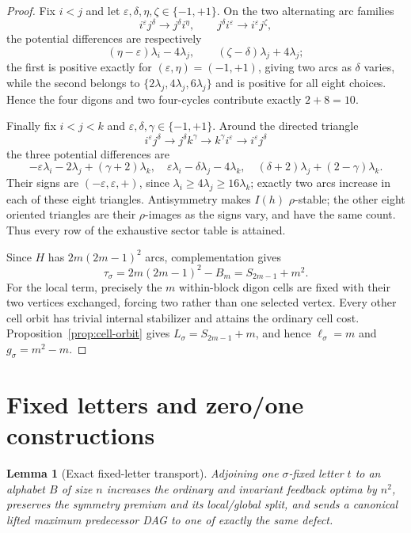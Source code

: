 \documentclass[11pt,a4paper]{article}
\newtheorem{lemma}[theorem]{Lemma}
\theoremstyle{remark}
\begin{document}
\begin{proof}
Fix \(i<j\) and let
\(\varepsilon,\delta,\eta,\zeta\in\{-1,+1\}\).  On the two alternating
arc families
\[
 i^\varepsilon j^\delta\to j^\delta i^\eta,
 \qquad
 j^\delta i^\varepsilon\to i^\varepsilon j^\zeta,
\]
the potential differences are respectively
\[
 (\eta-\varepsilon)\lambda_i-4\lambda_j,
 \qquad (\zeta-\delta)\lambda_j+4\lambda_j;
\]
the first is positive exactly for
\((\varepsilon,\eta)=(-1,+1)\), giving two arcs as \(\delta\) varies,
while the second belongs to \(\{2\lambda_j,4\lambda_j,6\lambda_j\}\) and
is positive for all eight choices.  Hence the four digons and two
four-cycles contribute exactly \(2+8=10\).

Finally fix \(i<j<k\) and
\(\varepsilon,\delta,\gamma\in\{-1,+1\}\).  Around the directed triangle
\[
 i^\varepsilon j^\delta\to j^\delta k^\gamma
 \to k^\gamma i^\varepsilon\to i^\varepsilon j^\delta
\]
the three potential differences are
\[
 -\varepsilon\lambda_i-2\lambda_j+(\gamma+2)\lambda_k,
 \quad \varepsilon\lambda_i-\delta\lambda_j-4\lambda_k,
 \quad (\delta+2)\lambda_j+(2-\gamma)\lambda_k.
\]
Their signs are \((-\varepsilon,\varepsilon,+)\), since
\(\lambda_i\geq4\lambda_j\geq16\lambda_k\); exactly two arcs increase in
each of these eight triangles.  Antisymmetry makes \(I(h)\) \(\rho\)-stable;
the other eight oriented triangles are their \(\rho\)-images as the signs
vary, and have the same count.  Thus every row
of the exhaustive sector table is attained.

Since \(H\) has \(2m(2m-1)^2\) arcs, complementation gives
\[
 \tau_\sigma=2m(2m-1)^2-B_m=S_{2m-1}+m^2.
\]
For the local term, precisely the \(m\) within-block digon cells are fixed
with their two vertices exchanged, forcing two rather than one selected
vertex.  Every other cell orbit has trivial internal stabilizer and attains
the ordinary cell cost.  Proposition~\ref{prop:cell-orbit} gives
\(L_\sigma=S_{2m-1}+m\), and hence
\(\ell_\sigma=m\) and \(g_\sigma=m^2-m\).
\end{proof}

\section{Fixed letters and zero/one constructions}
\label{sec:constructions}

\begin{lemma}[Exact fixed-letter transport]
\label{lem:fixed-letter}
Adjoining one \(\sigma\)-fixed letter \(t\) to an alphabet \(B\) of size
\(n\) increases the ordinary and invariant feedback optima by \(n^2\),
preserves the symmetry premium and its local/global split, and sends a
canonical lifted maximum predecessor DAG to one of exactly the same defect.
\end{lemma}
\end{document}
